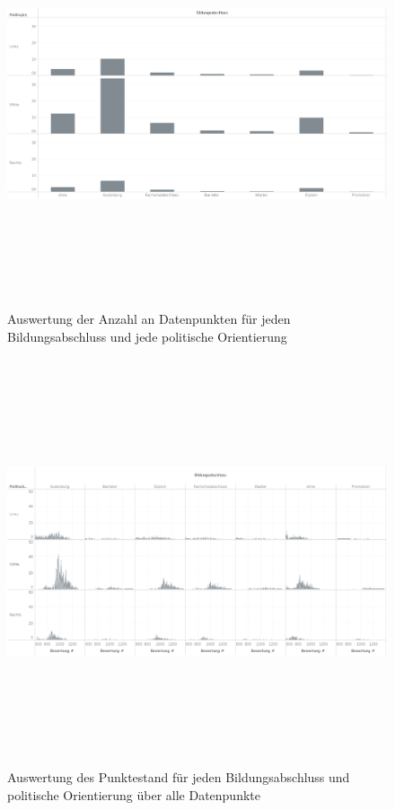 \documentclass[a4paper,12pt]{report}
\begin{document}
\begin{figure}[!h]
    \centering
    \includegraphics[width=16cm,height=12cm]{Diagramme/SZ2_Tab6.PNG}
    \caption{Auswertung der Anzahl an Datenpunkten für jeden Bildungsabschluss und jede politische Orientierung}
    \label{fig:SZ2Tab6}
\end{figure}

\begin{figure}[!h]
    \centering
    \includegraphics[width=16cm,height=12cm]{Diagramme/SZ2_Tab7.PNG}
    \caption{Auswertung des Punktestand für jeden Bildungsabschluss und politische Orientierung über alle Datenpunkte}
    \label{fig:SZ2Tab7}
\end{figure}
\end{document}
